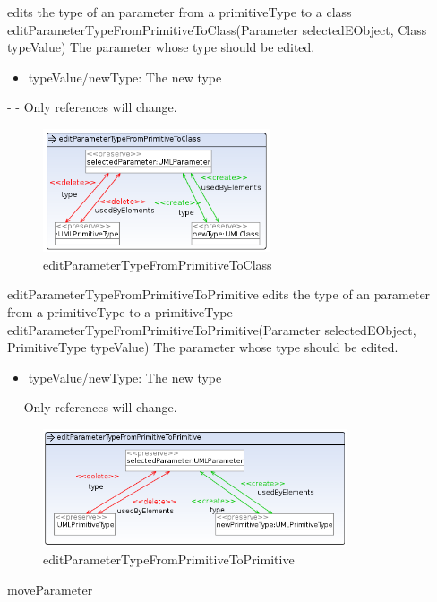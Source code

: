 {edits the type of an parameter from a primitiveType to a class}
{editParameterTypeFromPrimitiveToClass(Parameter selectedEObject, Class typeValue)}
{The parameter whose type should be edited.}
{
\begin{itemize}
 \item typeValue/newType: The new type
\end{itemize}
}
{-}
{-}
{Only references will change.}
\begin{figure}[H]
  \centering
  \includegraphics[width=0.60\textwidth]{pics/editParameterTypeFromPrimitiveToClass.png}
  \caption{editParameterTypeFromPrimitiveToClass}
  \label{editParameterTypeFromPrimitiveToClass}
\end{figure}
\op
{editParameterTypeFromPrimitiveToPrimitive}
{edits the type of an parameter from a primitiveType to a primitiveType}
{editParameterTypeFromPrimitiveToPrimitive(Parameter selectedEObject, PrimitiveType typeValue)}
{The parameter whose type should be edited.}
{
\begin{itemize}
 \item typeValue/newType: The new type
\end{itemize}
}
{-}
{-}
{Only references will change.}
\begin{figure}[H]
  \centering
  \includegraphics[width=0.8\textwidth]{pics/editParameterTypeFromPrimitiveToPrimitive.png}
  \caption{editParameterTypeFromPrimitiveToPrimitive}
  \label{editParameterTypeFromPrimitiveToPrimitive}
\end{figure}
\op
{moveParameter}
